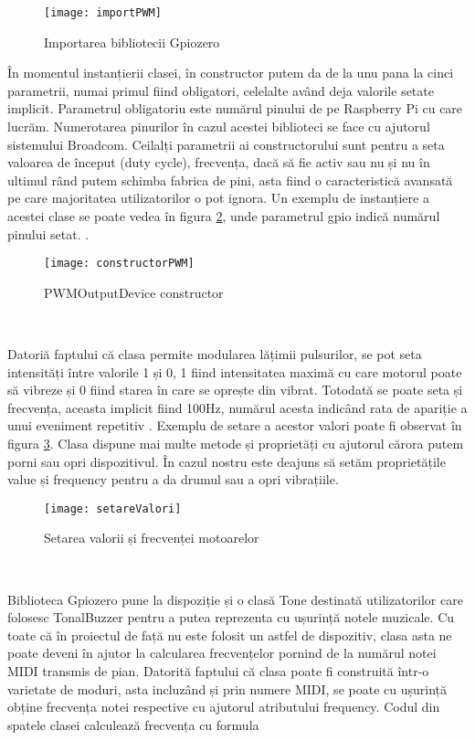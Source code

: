 \documentclass[../IoMusT.tex]{subfiles}
\begin{document}
\begin{figure}[h]
\centering
\texttt{[image: importPWM]}
\caption{Importarea bibliotecii Gpiozero}
\label{fig:import}
\end{figure}
În momentul instanțierii clasei, în constructor putem da de la unu pana la cinci parametrii, numai primul fiind obligatori, celelalte având deja valorile setate implicit. Parametrul obligatoriu este numărul pinului de pe Raspberry Pi cu care lucrăm. Numerotarea pinurilor în cazul acestei biblioteci se face cu ajutorul sistemului Broadcom. Ceilalți parametrii ai constructorului sunt pentru a seta valoarea de început (duty cycle), frecvența, dacă să fie activ sau nu și nu în ultimul rând putem schimba fabrica de pini, asta fiind o ca\-rac\-te\-ris\-ti\-că avansată pe care majoritatea utilizatorilor o pot ignora. Un exemplu de instanțiere a acestei clase se poate vedea în figura \ref{fig:constructor}, unde parametrul gpio indică numărul pinului setat. .
\begin{figure}[h]
\centering
\texttt{[image: constructorPWM]}
\caption{PWMOutputDevice constructor}
\label{fig:constructor}
\end{figure}
\\
\par Datoriă faptului că clasa permite modularea lățimii pulsurilor, se pot seta intensități între valorile 1 și 0, 1 fiind intensitatea maximă cu care motorul poate să vibreze și 0 fiind starea în care se oprește din vibrat. Totodată se poate seta și frecvența, aceasta implicit fiind 100Hz, numărul acesta indicând rata de apariție a unui eveniment repetitiv \cite{Freq}. Exemplu de setare a acestor valori poate fi observat în figura \ref{fig:val}. Clasa dispune mai multe metode și proprietăți cu ajutorul cărora putem porni sau opri dispozitivul. În cazul nostru este deajuns să setăm proprietățile value și frequency pentru a da drumul sau a opri vibrațiile. 
\begin{figure}[h]
\centering
\texttt{[image: setareValori]}
\caption{Setarea valorii și frecvenței motoarelor}
\label{fig:val}
\end{figure}
\\
\par Biblioteca Gpiozero pune la dispoziție și o clasă Tone destinată utilizatorilor care folosesc TonalBuzzer pentru a putea reprezenta cu ușurință notele muzicale. Cu toate că în proiectul de față nu este folosit un astfel de dis\-po\-zi\-tiv, clasa asta ne poate deveni în ajutor la calcularea frecvențelor pornind de la numărul notei MIDI transmis de pian. Datorită faptului că clasa poate fi construită într-o varietate de moduri, asta incluzând și prin numere MIDI, se poate cu ușurință obține frecvența notei respective cu ajutorul atributului frequency. Codul din spatele clasei calculează frecvența cu formula
\end{document}
